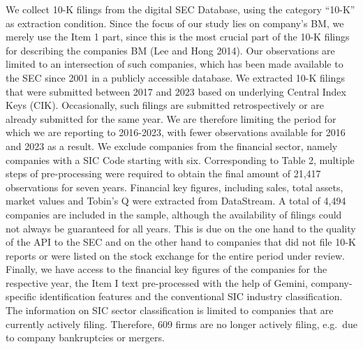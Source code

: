 \documentclass[
]{article}
\begin{document}
We collect 10-K filings from the digital SEC Database, using the
category ``10-K'' as extraction condition. Since the focus of our study
lies on company's BM, we merely use the Item 1 part, since this is the
most crucial part of the 10-K filings for describing the companies BM
(Lee and Hong 2014). Our observations are limited to an intersection of
such companies, which has been made available to the SEC since 2001 in a
publicly accessible database. We extracted 10-K filings that were
submitted between 2017 and 2023 based on underlying Central Index Keys
(CIK). Occasionally, such filings are submitted retrospectively or are
already submitted for the same year. We are therefore limiting the
period for which we are reporting to 2016-2023, with fewer observations
available for 2016 and 2023 as a result. We exclude companies from the
financial sector, namely companies with a SIC Code starting with six.
Corresponding to Table 2, multiple steps of pre-processing were required
to obtain the final amount of 21,417 observations for seven years.
Financial key figures, including sales, total assets, market values and
Tobin's Q were extracted from DataStream. A total of 4,494 companies are
included in the sample, although the availability of filings could not
always be guaranteed for all years. This is due on the one hand to the
quality of the API to the SEC and on the other hand to companies that
did not file 10-K reports or were listed on the stock exchange for the
entire period under review. Finally, we have access to the financial key
figures of the companies for the respective year, the Item I text
pre-processed with the help of Gemini, company-specific identification
features and the conventional SIC industry classification. The
information on SIC sector classification is limited to companies that
are currently actively filing. Therefore, 609 firms are no longer
actively filing, e.g.~due to company bankruptcies or mergers.
\end{document}
